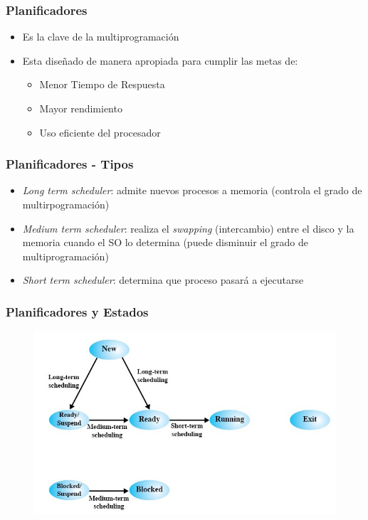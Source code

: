 \begin{frame}
  \frametitle{Planificadores}
  \begin{itemize}
	  \item Es la clave de la multiprogramación
	  \item Esta diseñado de manera apropiada para cumplir las metas de:
	  \begin{itemize}
	  	\item Menor Tiempo de Respuesta
	  	\item Mayor rendimiento
	  	\item Uso eficiente del procesador
	  \end{itemize}
  \end{itemize}
\end{frame}

\begin{frame}
  \frametitle{Planificadores - Tipos}
  \begin{itemize}
		\item \textit{Long term scheduler}: admite nuevos procesos a memoria (controla el grado de multirpogramación)
		\item \textit{Medium term scheduler}: realiza el \emph{swapping} (intercambio) entre el disco y la memoria cuando el SO lo determina (puede disminuir el grado de multiprogramación)
		\item \textit{Short term scheduler}: determina que proceso pasará a ejecutarse
  \end{itemize}
\end{frame}

\begin{frame}
  \frametitle{Planificadores y Estados}
  \begin{figure}
    \includegraphics[scale=0.4]{images/statesSchedulers.png}
  \end{figure}
\end{frame}

